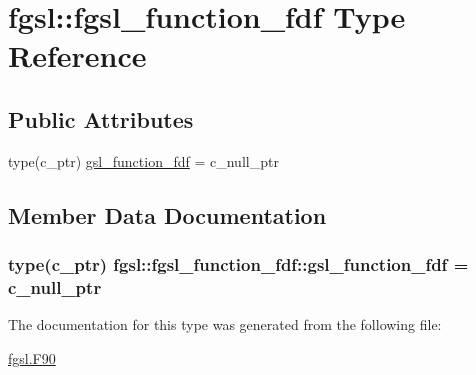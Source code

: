\hypertarget{structfgsl_1_1fgsl__function__fdf}{\section{fgsl\-:\-:fgsl\-\_\-function\-\_\-fdf Type Reference}
\label{structfgsl_1_1fgsl__function__fdf}
}
\subsection*{Public Attributes}
\begin{DoxyCompactItemize}
\item 
type(c\-\_\-ptr) \hyperlink{structfgsl_1_1fgsl__function__fdf_a084f8ac7c74ec8371923ffc2185d668e}{gsl\-\_\-function\-\_\-fdf} = c\-\_\-null\-\_\-ptr
\end{DoxyCompactItemize}


\subsection{Member Data Documentation}
\hypertarget{structfgsl_1_1fgsl__function__fdf_a084f8ac7c74ec8371923ffc2185d668e}{
\subsubsection[{gsl\-\_\-function\-\_\-fdf}]{\setlength{\rightskip}{0pt plus 5cm}type(c\-\_\-ptr) fgsl\-::fgsl\-\_\-function\-\_\-fdf\-::gsl\-\_\-function\-\_\-fdf = c\-\_\-null\-\_\-ptr}}\label{structfgsl_1_1fgsl__function__fdf_a084f8ac7c74ec8371923ffc2185d668e}


The documentation for this type was generated from the following file\-:\begin{DoxyCompactItemize}
\item 
\hyperlink{fgsl_8F90}{fgsl.\-F90}\end{DoxyCompactItemize}
